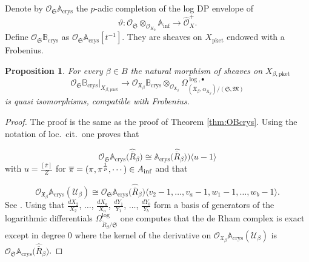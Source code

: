 \documentclass[asterisque,english]{smfart}
\newtheorem{proposition}[theo]{Proposition}
\begin{document}
\smallskip


 
Denote by ${\mathcal{O}}_{\mathfrak{S}}\mathbb{A}_{\mathrm{crys}}$ the $p$-adic completion of the log DP envelope of $$\vartheta\colon  \mathcal{O}_{\mathfrak{S}}\otimes_{\mathcal{O}_{K_0}} \mathbb{A}_{\mathrm{inf}} \to \widehat{\mathcal{O}}_{X}^+.$$Define $\mathcal{O}_{\mathfrak{S}}\mathbb{B}_{\mathrm{crys}}$  as ${\mathcal{O}}_{\mathfrak{S}}\mathbb{A}_{\mathrm{crys}}[t^{-1}]$. They are sheaves on $X_{\mathrm{pket}}$ endowed with a Frobenius. 




\begin{proposition}\label{prop:OBlog} For every $\beta\in B$ the natural morphism of sheaves on $X_{\beta,\mathrm{pket}}$ $$\mathcal{O}_{\mathfrak{S}}\mathbb{B}_{\mathrm{crys}}\vert_{X_{\beta, \mathrm{pket}}} \longrightarrow{\mathcal{O}}_{\mathfrak{X}_\beta}\mathbb{B}_{\mathrm{crys}}\otimes_{\mathcal{O}_{\mathfrak{X}_\beta}} \Omega_{(\mathfrak{X}_\beta,\alpha_{\mathfrak{X}_\beta})/(\mathfrak{S},\mathfrak{M})}^{\log,\bullet} $$is  quasi isomorphisms, compatible with Frobenius. 
\end{proposition}
\begin{proof} The proof is the same as the proof of Theorem  \ref{thm:OBcrys}. Using the notation of loc.~cit.~one  proves that

$$\mathcal{O}_{\mathfrak{S}}\mathbb{A}_{\mathrm{crys}}\bigl(\widehat{\overline{R}}_\beta\bigr) \cong \mathbb{A}_{\mathrm{crys}}\bigl(\widehat{\overline{R}}_\beta\bigr) )\langle u-1 \rangle$$with $u=\frac{[\overline{\pi}]}{Z}$ for $\overline{\pi}=(\pi, \pi^{\frac{1}{p}},\cdots )\in A_{\rm inf}$ and that 

$$\mathcal{O}_{\mathfrak{X}_\beta}\mathbb{A}_{\mathrm{crys}}(\mathcal{U}_\beta)\cong {\mathcal{O}}_{\mathfrak{S}}\mathbb{A}_{\mathrm{crys}}\bigl(\widehat{\overline{R}}_\beta\bigr)\langle v_2-1, \ldots, v_a-1,w_1-1,\ldots,w_b-1\rangle.$$See \cite[Lemma 3.25]{AI}. Using that $\frac{d X_2}{X_2}$, $\ldots$, $ \frac{d X_a}{X_a}$, $\frac{d Y_1}{Y_1}$, $\ldots$, $\frac{d Y_b}{Y_b}$  form a basis of generators of the logarithmic differentials $\Omega^{\log}_{\widetilde{R}_\beta/\mathfrak{S}}$ one computes that the de Rham complex is exact except in degree $0$ where the kernel of the derivative on $\mathcal{O}_{\mathfrak{X}_\beta}\mathbb{A}_{\mathrm{crys}}(\mathcal{U}_\beta)$ is ${\mathcal{O}}_{\mathfrak{S}}\mathbb{A}_{\mathrm{crys}}\bigl(\widehat{\overline{R}}_\beta\bigr)$.
\end{proof}
\end{document}
